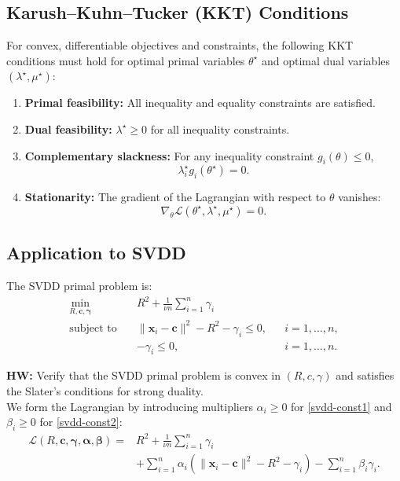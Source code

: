 \documentclass[11pt]{report}
\begin{document}
\subsection{Karush–Kuhn–Tucker (KKT) Conditions}
For convex, differentiable objectives and constraints, the following KKT conditions must hold for optimal primal variables $\theta^\star$ and optimal dual variables $(\lambda^\star, \mu^\star)$:
\begin{enumerate}
    \item \textbf{Primal feasibility:} All inequality and equality constraints are satisfied.
    \item \textbf{Dual feasibility:} $\lambda^\star \geq 0$ for all inequality constraints.
    \item \textbf{Complementary slackness:} For any inequality constraint $g_i(\theta) \leq 0$,
    \[
    \lambda_i^\star g_i(\theta^\star) = 0.
    \]
    \item \textbf{Stationarity:} The gradient of the Lagrangian with respect to $\theta$ vanishes:
    \[
    \nabla_\theta \mathcal{L}(\theta^\star, \lambda^\star, \mu^\star) = 0.
    \]
\end{enumerate}

\subsection{Application to SVDD}
The SVDD primal problem is:
\begin{align}
\min_{R, \mathbf{c}, \boldsymbol{\gamma}} \quad & R^2 + \frac{1}{\nu n} \sum_{i=1}^{n} \gamma_i \label{svdd-primal} \\
\text{subject to} \quad 
& \|\mathbf{x}_i - \mathbf{c} \|^2 - R^2 - \gamma_i \leq 0, 
&& i = 1, \ldots, n, \label{svdd-const1} \\
& -\gamma_i \leq 0, 
&& i = 1, \ldots, n. \label{svdd-const2}
\end{align}

\textbf{HW:} Verify that the SVDD primal problem is convex in $(R, c, \gamma)$ and satisfies the Slater's conditions for strong duality. \cite{chang2013svdd} \\

We form the Lagrangian by introducing multipliers $\alpha_i \geq 0$ for \eqref{svdd-const1} and $\beta_i \geq 0$ for \eqref{svdd-const2}:
\begin{align}
\mathcal{L}(R, \mathbf{c}, \boldsymbol{\gamma}, \boldsymbol{\alpha}, \boldsymbol{\beta}) 
= & R^2 + \frac{1}{\nu n} \sum_{i=1}^n \gamma_i \nonumber \\
& + \sum_{i=1}^n \alpha_i \left( \|\mathbf{x}_i - \mathbf{c} \|^2 - R^2 - \gamma_i \right) 
- \sum_{i=1}^n \beta_i \gamma_i.
\end{align}
\end{document}

